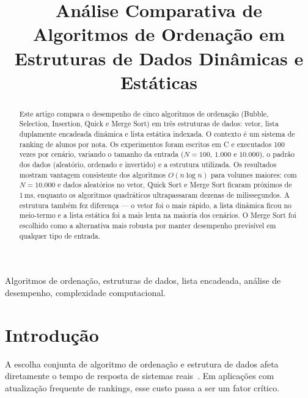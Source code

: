 \documentclass[conference]{IEEEtran}
\begin{document}
\title{Análise Comparativa de Algoritmos de Ordenação em Estruturas de Dados Dinâmicas e Estáticas}

\author{
}

\maketitle

\begin{abstract}
Este artigo compara o desempenho de cinco algoritmos de ordenação (Bubble, Selection, Insertion, Quick e Merge Sort) em três estruturas de dados: vetor, lista duplamente encadeada dinâmica e lista estática indexada. O contexto é um sistema de ranking de alunos por nota. Os experimentos foram escritos em C e executados 100 vezes por cenário, variando o tamanho da entrada ($N = 100$, $1.000$ e $10.000$), o padrão dos dados (aleatório, ordenado e invertido) e a estrutura utilizada. Os resultados mostram vantagem consistente dos algoritmos $O(n \log n)$ para volumes maiores: com $N = 10.000$ e dados aleatórios no vetor, Quick Sort e Merge Sort ficaram próximos de 1\,ms, enquanto os algoritmos quadráticos ultrapassaram dezenas de milissegundos. A estrutura também fez diferença — o vetor foi o mais rápido, a lista dinâmica ficou no meio-termo e a lista estática foi a mais lenta na maioria dos cenários. O Merge Sort foi escolhido como a alternativa mais robusta por manter desempenho previsível em qualquer tipo de entrada.
\end{abstract}

\begin{IEEEkeywords}
Algoritmos de ordenação, estruturas de dados, lista encadeada, análise de desempenho, complexidade computacional.
\end{IEEEkeywords}

\section{Introdução}

A escolha conjunta de algoritmo de ordenação e estrutura de dados afeta diretamente o tempo de resposta de sistemas reais~\cite{cormen,sedgewick}. Em aplicações com atualização frequente de rankings, esse custo passa a ser um fator crítico.
\end{document}
